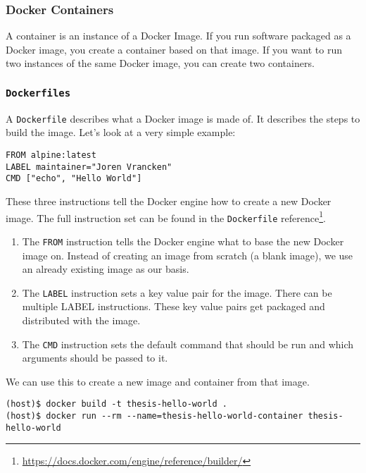 \subsubsection{Docker Containers}
A container is an instance of a Docker Image. If you run software packaged as a Docker image, you create a container based on that image. If you want to run two instances of the same Docker image, you can create two containers.

\subsubsection{\texorpdfstring{\lstinline{Dockerfiles}}{Dockerfiles}}
A \lstinline{Dockerfile} describes what a Docker image is made of. It describes the steps to build the image. Let's look at a very simple example:

\begin{lstlisting}[caption={Very Basic \lstinline{Dockerfile}},label={listing:dockerfile-simple},captionpos=b]
FROM alpine:latest
LABEL maintainer="Joren Vrancken"
CMD ["echo", "Hello World"]
\end{lstlisting}

These three instructions tell the Docker engine how to create a new Docker image.
The full instruction set can be found in the \lstinline{Dockerfile} reference\footnote{\url{https://docs.docker.com/engine/reference/builder/}}.

\begin{enumerate}
    \item The \lstinline{FROM} instruction tells the Docker engine what to base the new Docker image on. Instead of creating an image from scratch (a blank image), we use an already existing image as our basis.

    \item The \lstinline{LABEL} instruction sets a key value pair for the image. There can be multiple LABEL instructions. These key value pairs get packaged and distributed with the image.

    \item The \lstinline{CMD} instruction sets the default command that should be run and which arguments should be passed to it.
\end{enumerate}

We can use this to create a new image and container from that image.
\begin{lstlisting}[caption={Creating a Docker container from a \lstinline{Dockerfile}},label={listing:create-container},captionpos=b]
(host)$ docker build -t thesis-hello-world .
(host)$ docker run --rm --name=thesis-hello-world-container thesis-hello-world
\end{lstlisting}

